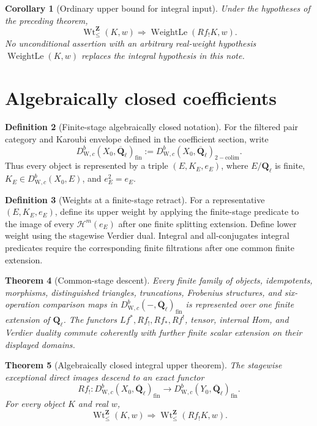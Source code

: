 \documentclass[10pt]{article}
\newtheorem{theorem}{Theorem}[section]
\newtheorem{corollary}[theorem]{Corollary}
\theoremstyle{definition}
\newtheorem{definition}[theorem]{Definition}
\newcommand{\Ql}{\mathbf Q_\ell}
\newcommand{\Qlb}{\overline{\mathbf Q}_\ell}
\newcommand{\WeilD}{D^b_{\mathrm W,c}}
\newcommand{\WtLe}{\operatorname{WeightLe}}
\newcommand{\IntWtLe}{\operatorname{Wt}^{\mathbf Z}_{\leq}}
\begin{document}
\begin{corollary}[Ordinary upper bound for integral input]
Under the hypotheses of the preceding theorem,
\[
        \IntWtLe(K,w)\Longrightarrow\WtLe(Rf_!K,w).
\]
No unconditional assertion with an arbitrary real-weight hypothesis
\(\WtLe(K,w)\) replaces the integral hypothesis in this note.
\end{corollary}

\section{Algebraically closed coefficients}

\begin{definition}[Finite-stage algebraically closed notation]
For the filtered pair category and Karoubi envelope defined in the
coefficient section, write
\[
 \WeilD(X_0,\Qlb)_{\mathrm{fin}}
 :=\WeilD(X_0,\Qlb)_{\mathrm{2-colim}}.
\]
Thus every object is represented by a triple \((E,K_E,e_E)\), where
\(E/\Ql\) is finite, \(K_E\in\WeilD(X_0,E)\), and \(e_E^2=e_E\).
\end{definition}

\begin{definition}[Weights at a finite-stage retract]
For a representative \((E,K_E,e_E)\), define its upper weight by applying
the finite-stage predicate to the image of every
\(\mathcal H^m(e_E)\) after one finite splitting extension.  Define lower
weight using the stagewise Verdier dual.  Integral and all-conjugates
integral predicates require the corresponding finite filtrations after one
common finite extension.
\end{definition}

\begin{theorem}[Common-stage descent]
Every finite family of objects, idempotents, morphisms, distinguished
triangles, truncations, Frobenius structures, and six-operation comparison
maps in \(\WeilD(-,\Qlb)_{\mathrm{fin}}\) is represented over one finite
extension of \(\Ql\).  The functors \(Lf^*,Rf_!,Rf_*,Rf^!\), tensor,
 internal Hom, and Verdier duality commute coherently with
further finite scalar extension on their displayed domains.
\end{theorem}

\begin{theorem}[Algebraically closed integral upper theorem]
The stagewise exceptional direct images descend to an exact functor
\[
 Rf_!: \WeilD(X_0,\Qlb)_{\mathrm{fin}}
       \longrightarrow\WeilD(Y_0,\Qlb)_{\mathrm{fin}}.
\]
For every object \(K\) and real \(w\),
\[
               \IntWtLe(K,w)\Longrightarrow\IntWtLe(Rf_!K,w).
\]
\end{theorem}
\end{document}
